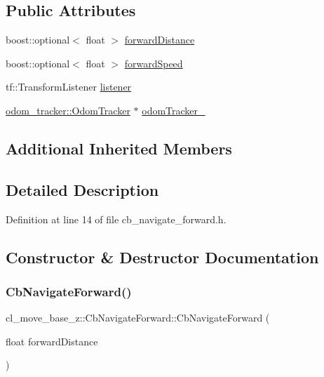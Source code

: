 \subsection*{Public Attributes}
\begin{DoxyCompactItemize}
\item 
boost\+::optional$<$ float $>$ \hyperlink{classcl__move__base__z_1_1CbNavigateForward_a41bc9c319c64be6302f7365173ccd2c5}{forward\+Distance}
\item 
boost\+::optional$<$ float $>$ \hyperlink{classcl__move__base__z_1_1CbNavigateForward_acd3a70c0886d7021f37405fb07d96cc9}{forward\+Speed}
\item 
tf\+::\+Transform\+Listener \hyperlink{classcl__move__base__z_1_1CbNavigateForward_a4fcb3933f612a0801bf373fbdeec71f5}{listener}
\item 
\hyperlink{classcl__move__base__z_1_1odom__tracker_1_1OdomTracker}{odom\+\_\+tracker\+::\+Odom\+Tracker} $\ast$ \hyperlink{classcl__move__base__z_1_1CbNavigateForward_a7583a4d669af48618bd45950db8e5292}{odom\+Tracker\+\_\+}
\end{DoxyCompactItemize}
\subsection*{Additional Inherited Members}


\subsection{Detailed Description}


Definition at line 14 of file cb\+\_\+navigate\+\_\+forward.\+h.



\subsection{Constructor \& Destructor Documentation}
\mbox{\label{classcl__move__base__z_1_1CbNavigateForward_a99ad479eeee7116e68cdb41870223eeb}} 
\subsubsection{\texorpdfstring{Cb\+Navigate\+Forward()}{CbNavigateForward()}\hspace{0.1cm}{\footnotesize\ttfamily [1/2]}}
{\footnotesize\ttfamily cl\+\_\+move\+\_\+base\+\_\+z\+::\+Cb\+Navigate\+Forward\+::\+Cb\+Navigate\+Forward (\begin{DoxyParamCaption}\item[{float}]{forward\+Distance }\end{DoxyParamCaption})}



